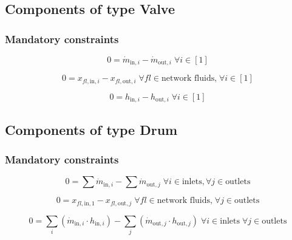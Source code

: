 \subsection{Components of type Valve}

\subsubsection{Mandatory constraints}

\begin{equation}
\label{eq:Valve_mass_flow_constraints}
0=\dot{m}_{\mathrm{in,}i}-\dot{m}_{\mathrm{out,}i}\; \forall i \in [1]
\end{equation}

\begin{equation}
\label{eq:Valve_fluid_constraints}
0=x_{fl\mathrm{,in,}i}-x_{fl\mathrm{,out,}i}\;\forall fl \in\text{network fluids,}\; \forall i \in [1]
\end{equation}

\begin{equation}
\label{eq:Valve_enthalpy_equality_constraints}
0=h_{\mathrm{in,}i}-h_{\mathrm{out,}i}\; \forall i \in [1]
\end{equation}


\subsection{Components of type Drum}

\subsubsection{Mandatory constraints}

\begin{equation}
\label{eq:Drum_mass_flow_constraints}
0 =\sum\dot{m}_{\mathrm{in},i}-\sum\dot{m}_{\mathrm{out},j}\;\forall i \in \text{inlets}, \forall j \in \text{outlets}
\end{equation}

\begin{equation}
\label{eq:Drum_fluid_constraints}
0 = x_{fl\mathrm{,in,1}} - x_{fl\mathrm{,out,}j}\; \forall fl \in \text{network fluids,} \; \forall j \in\text{outlets}
\end{equation}

\begin{equation}
\label{eq:Drum_energy_balance_constraints}
0=\sum_i\left(\dot{m}_{\mathrm{in,}i}\cdot h_{\mathrm{in,}i}\right) - \sum_j \left(\dot{m}_{\mathrm{out,}j} \cdot h_{\mathrm{out,}j} \right) \; \forall i \in \text{inlets} \;\forall j \in \text{outlets}
\end{equation}

